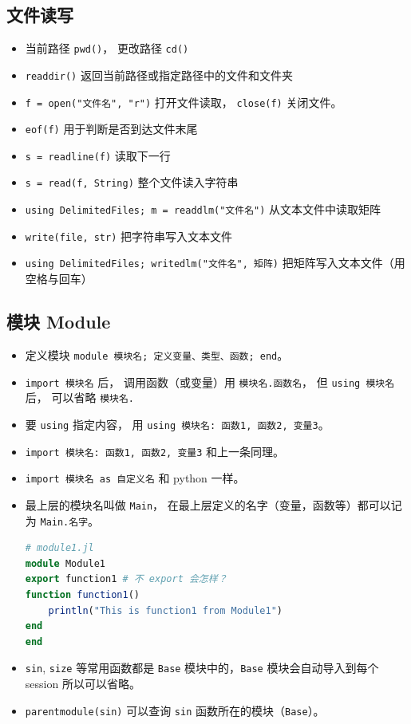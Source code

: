 \subsection{文件读写}
\begin{itemize}
\item 当前路径 \verb`pwd()`， 更改路径 \verb`cd()`
\item \verb`readdir()` 返回当前路径或指定路径中的文件和文件夹
\item \verb`f = open("文件名", "r")` 打开文件读取， \verb`close(f)` 关闭文件。
\item \verb`eof(f)` 用于判断是否到达文件末尾
\item \verb`s = readline(f)` 读取下一行
\item \verb`s = read(f, String)` 整个文件读入字符串
\item \verb`using DelimitedFiles; m = readdlm("文件名")` 从文本文件中读取矩阵
\item \verb`write(file, str)` 把字符串写入文本文件
\item \verb`using DelimitedFiles; writedlm("文件名", 矩阵)` 把矩阵写入文本文件（用空格与回车）
\end{itemize}


\subsection{模块 Module}
\begin{itemize}
\item 定义模块 \verb`module 模块名; 定义变量、类型、函数; end`。
\item \verb`import 模块名` 后， 调用函数（或变量）用 \verb`模块名.函数名`， 但 \verb`using 模块名` 后， 可以省略 \verb`模块名.`
\item 要 \verb`using` 指定内容， 用 \verb`using 模块名: 函数1, 函数2, 变量3`。
\item \verb`import 模块名: 函数1, 函数2, 变量3` 和上一条同理。
\item \verb`import 模块名 as 自定义名` 和 python 一样。
\item 最上层的模块名叫做 \verb`Main`， 在最上层定义的名字（变量，函数等）都可以记为 \verb`Main.名字`。
\begin{lstlisting}[language=julia]
# module1.jl
module Module1
export function1 # 不 export 会怎样？
function function1()
    println("This is function1 from Module1")
end
end
\end{lstlisting}
\item \verb`sin`, \verb`size` 等常用函数都是 \verb`Base` 模块中的，\verb`Base` 模块会自动导入到每个 session 所以可以省略。
\item \verb`parentmodule(sin)` 可以查询 \verb`sin` 函数所在的模块（\verb`Base`）。
\end{itemize}



